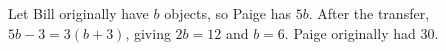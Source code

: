 Let Bill originally have $b$ objects, so Paige has $5b$. After the transfer, $5b-3=3(b+3)$, giving $2b=12$ and $b=6$. Paige originally had $\boxed{30}$.
